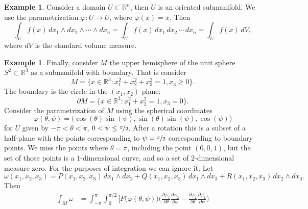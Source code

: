 \documentclass[12pt,openany]{book}
\newcommand{\R}{{\mathbb{R}}}
\theoremstyle{plain}
\theoremstyle{remark}
\theoremstyle{definition}
\theoremstyle{exercise}
\theoremstyle{example}
\newtheorem{example}[thm]{Example}
\begin{document}
\begin{example}
Consider a domain $U \subset \R^n$, then $U$ is an oriented submanifold.
We use the parametrization $\varphi \colon U \to U$, where $\varphi(x) =
x$.  Then
\begin{equation*}
\int_U f(x) \, dx_1 \wedge dx_2 \wedge \cdots \wedge dx_n
=
\int_U f(x) \, dx_1 \, dx_2 \,  \cdots \, dx_n
=
\int_U f(x) \, dV ,
\end{equation*}
where $dV$ is the standard volume measure.
\end{example}

\begin{example}
Finally, consider $M$
the upper hemisphere of the unit sphere $S^2 \subset \R^3$ as a submanifold
with boundary.  That is consider
\begin{equation*}
M = \bigl\{ x \in \R^3 : x_1^2+x_2^2+x_3^2=1, x_3 \geq 0 \bigr\} .
\end{equation*}
The boundary is the circle in the $(x_1,x_2)$-plane:
\begin{equation*}
\partial M = \bigl\{ x \in \R^3 : x_1^2+x_2^2=1, x_3 = 0 \bigr\} .
\end{equation*}
Consider the parametrization of $M$ using the spherical coordinates
\begin{equation*}
\varphi(\theta,\psi) =
\bigl(\cos(\theta) \sin(\psi),
 \sin(\theta) \sin(\psi),
 \cos(\psi)\bigr)
\end{equation*}
for $U$ given by $-\pi < \theta < \pi$, $0 < \psi \leq \nicefrac{\pi}{2}$.  After
a rotation this is a subset of a half-plane with the points corresponding to
$\psi = \nicefrac{\pi}{2}$ corresponding to boundary points.  We miss the
points where $\theta = \pi$, including the point $(0,0,1)$, but the set of
those points is a $1$-dimensional curve, and so a set of $2$-dimensional
measure zero. For the purposes of integration we can ignore it.
Let
\begin{equation*}
\omega(x_1,x_2,x_3) =
P(x_1,x_2,x_3) \, dx_1 \wedge dx_2
+ Q(x_1,x_2,x_3) \, dx_1 \wedge dx_3
+ R(x_1,x_2,x_3) \, dx_2 \wedge dx_3 .
\end{equation*}
Then
\begin{equation*}
\begin{split}
\int_M \omega & =
\int_{-\pi}^\pi
\int_{0}^{\pi/2}
\biggl[
P\bigl(\varphi(\theta,\psi)\bigr) \biggl(
\frac{\partial \varphi_1}{\partial \theta}
\frac{\partial \varphi_2}{\partial \psi}
-
\frac{\partial \varphi_2}{\partial \theta}
\frac{\partial \varphi_1}{\partial \psi}
\biggr)
\\

\end{split}
\end{equation*}
\end{example}
\end{document}
